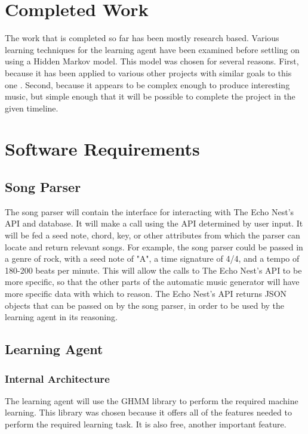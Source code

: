 \documentclass{article}
\begin{document}
\section{Completed Work}
The work that is completed so far has been mostly research based. Various learning techniques for the learning agent have been examined before settling on using a Hidden Markov model. This model was chosen for several reasons. First, because it has been applied to various other projects with similar goals to this one \cite{761266, 1394661} . Second, because it appears to be complex enough to produce interesting music, but simple enough that it will be possible to complete the project in the given timeline.\\

\section{Software Requirements}
\subsection{Song Parser}
The song parser will contain the interface for interacting with The Echo Nest's API and database. It will make a call using the API determined by user input. It will be fed a seed note, chord, key, or other attributes from which the parser can locate and return relevant songs. For example, the song parser could be passed in a genre of rock, with a seed note of "A", a time signature of 4/4, and a tempo of 180-200 beats per minute. This will allow the calls to The Echo Nest's API to be more specific, so that the other parts of the automatic music generator will have more specific data with which to reason. The Echo Nest's API returns JSON objects that can be passed on by the song parser, in order to be used by the learning agent in its reasoning.

\subsection{Learning Agent}
\subsubsection{Internal Architecture}
The learning agent will use the GHMM library \cite{GHMM} to perform the required machine learning. This library was chosen because it offers all of the features needed to perform the required learning task. It is also free, another important feature.
\end{document}

